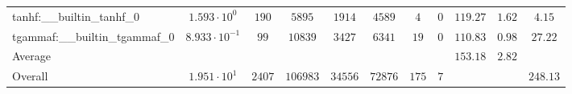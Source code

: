 \begin{tabular}{|l|c|c|c|c|c|c|c|c|c|c|}
tanhf:\_\_builtin\_tanhf\_0               & $ 1.593 \cdot 10^{0}  $ & $ 190    $ & $ 5895   $ & $ 1914  $ & $ 4589  $ & $ 4   $ & $ 0 $ & $ 119.27      $ & $ 1.62    $ & $ 4.15    $ \\
tgammaf:\_\_builtin\_tgammaf\_0           & $ 8.933 \cdot 10^{-1} $ & $ 99     $ & $ 10839  $ & $ 3427  $ & $ 6341  $ & $ 19  $ & $ 0 $ & $ 110.83      $ & $ 0.98    $ & $ 27.22   $ \\
\hline
Average                                   & $                     $ & $        $ & $        $ & $       $ & $       $ & $     $ & $   $ & $ 153.18      $ & $ 2.82    $ & $         $ \\
\hline
Overall                                   & $ 1.951 \cdot 10^{1}  $ & $ 2407   $ & $ 106983 $ & $ 34556 $ & $ 72876 $ & $ 175 $ & $ 7 $ & $             $ & $         $ & $ 248.13  $ \\
\hline
\end{tabular}
